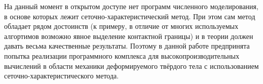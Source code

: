 На данный момент в открытом доступе нет программ численного моделирования, в
основе которых лежит сеточно-характеристический метод. При этом сам метод 
обладает рядом достоинств (к примеру, в отличие от многих используемых алгортимов
возможно явное выделение контактной границы) и в теории должен давать весьма
качественные результаты. Поэтому в данной работе предпринята попытка реализации
программного комплекса для высокопроизводительных вычислений в области механики
деформируемого твёрдого тела с использованием сеточно-характеристического
метода.
